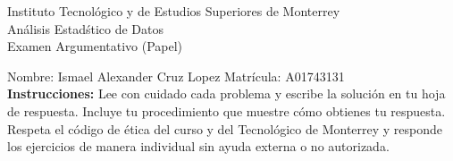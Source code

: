 \documentclass[10pt]{report}
\begin{document}
\newpage



\begin{center}
{\large Instituto Tecnol\'{o}gico y de Estudios Superiores de Monterrey \\
An\'alisis Estad\'stico de Datos } \\
Examen Argumentativo (Papel)
\end{center}

Nombre: \underline{\hspace*{.2in}}
Ismael Alexander Cruz Lopez
\underline{\hspace*{.2in}} \quad Matr\'icula:\underline{\hspace*{.2in}}
A01743131
\underline{\hspace*{.2in}} \\

{\bf Instrucciones:} Lee con cuidado cada problema y escribe la soluci\'on
en tu hoja de respuesta. Incluye tu procedimiento que muestre c\'omo obtienes tu respuesta.  Respeta el c\'odigo de \'etica del curso y del Tecnol\'ogico de Monterrey y responde los ejercicios de manera individual sin ayuda externa o no autorizada.
\end{document}
